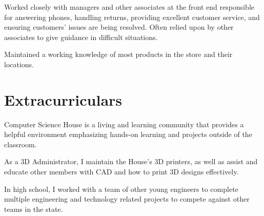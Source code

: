 \documentclass[letter]{comcv}
\begin{document}
    \begin{tightlist}
    \item Worked closely with managers and other associates at the front end responsible for answering phones, handling returns, providing excellent customer service, and ensuring customers' issues are being resolved. Often relied upon by other associates to give guidance in difficult situations.
    \item Maintained a working knowledge of most products in the store and their locations.
    \end{tightlist}



\section{Extracurriculars}

\begin{tightlist}
    \item Computer Science House is a living and learning community that provides a helpful environment emphasizing hands-on learning and projects outside of the classroom.
	\item As a 3D Administrator, I maintain the House's 3D printers, as well as assist and educate other members with CAD and how to print 3D designs effectively.
\end{tightlist}


\begin{tightlist}
    \item In high school, I worked with a team of other young engineers to complete multiple engineering and technology related projects to compete against other teams in the state.
\end{tightlist}
\end{document}

